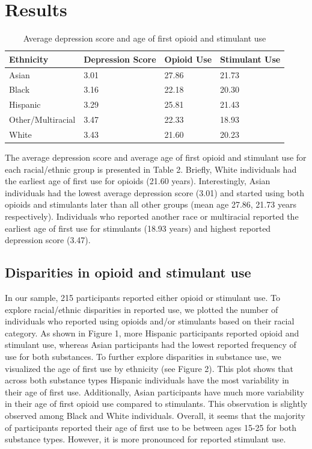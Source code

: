 \documentclass[man]{apa6}
\begin{document}
\section{Results}\label{results}

\begin{table}[tbp]
\begin{center}
\begin{threeparttable}
\caption{\label{tab:ST_table}Average depression score and age of first opioid and stimulant use}
\begin{tabular}{llll}
\toprule
Ethnicity & \multicolumn{1}{c}{Depression Score} & \multicolumn{1}{c}{Opioid Use} & \multicolumn{1}{c}{Stimulant Use}\\
\midrule
Asian & 3.01 & 27.86 & 21.73\\
Black & 3.16 & 22.18 & 20.30\\
Hispanic & 3.29 & 25.81 & 21.43\\
Other/Multiracial & 3.47 & 22.33 & 18.93\\
White & 3.43 & 21.60 & 20.23\\
\bottomrule
\end{tabular}
\end{threeparttable}
\end{center}
\end{table}

The average depression score and average age of first opioid and
stimulant use for each racial/ethnic group is presented in Table 2.
Briefly, White individuals had the earliest age of first use for opioids
(21.60 years). Interestingly, Asian individuals had the lowest average
depression score (3.01) and started using both opioids and stimulants
later than all other groups (mean age 27.86, 21.73 years respectively).
Individuals who reported another race or multiracial reported the
earliest age of first use for stimulants (18.93 years) and highest
reported depression score (3.47).

\subsection{Disparities in opioid and stimulant
use}\label{disparities-in-opioid-and-stimulant-use}

In our sample, 215 participants reported either opioid or stimulant use.
To explore racial/ethnic disparities in reported use, we plotted the
number of individuals who reported using opioids and/or stimulants based
on their racial category. As shown in Figure 1, more Hispanic
participants reported opioid and stimulant use, whereas Asian
participants had the lowest reported frequency of use for both
substances. To further explore disparities in substance use, we
visualized the age of first use by ethnicity (see Figure 2). This plot
shows that across both substance types Hispanic individuals have the
most variability in their age of first use. Additionally, Asian
participants have much more variability in their age of first opioid use
compared to stimulants. This observation is slightly observed among
Black and White individuals. Overall, it seems that the majority of
participants reported their age of first use to be between ages 15-25
for both substance types. However, it is more pronounced for reported
stimulant use.
\end{document}
